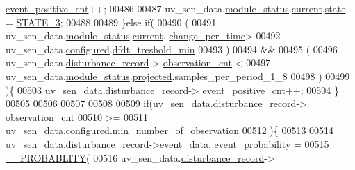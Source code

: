 \begin{DoxyCode}
      \hyperlink{a00028_a7397b9d76d4b57500f27bb23d258a18a}{event\_positive\_cnt}++;
00486 
00487                uv\_sen\_data.\hyperlink{a00035_a5a53c391562b059eb744ac679f3765ca}{module\_status}.\hyperlink{a00017_ab8af48cdbba92b3ae39c4470e53af944}{current}.\hyperlink{a00017_a6b8d8e916bc56265a3fd279bd26b6d1b}{state} = 
      \hyperlink{a00021_ad87f1bc8466a25d9f7da68717d324a22}{STATE\_3};
00488 
00489              \}\textcolor{keywordflow}{else} \textcolor{keywordflow}{if}(
00490                      (
00491                      uv\_sen\_data.\hyperlink{a00035_a5a53c391562b059eb744ac679f3765ca}{module\_status}.\hyperlink{a00017_ab8af48cdbba92b3ae39c4470e53af944}{current}.
      \hyperlink{a00017_ad5c4f9a39d2a36632a53205ae8eb5a5d}{change\_per\_time}>
00492                      uv\_sen\_data.\hyperlink{a00035_a94b2d1f6ea4ab334c74d24984dd27843}{configured}.\hyperlink{a00021_a6f5257920e763b7f5f440bc0515cd963}{dfdt\_treshold\_min}
00493                      )
00494                      &&
00495                      (
00496                      uv\_sen\_data.\hyperlink{a00035_ac9b38e2c1d3f1013a88d33506c754152}{disturbance\_record}->
      \hyperlink{a00028_ad5b0bac02ce266b91b2b52a1c3ea1d78}{observation\_cnt} <
00497                      uv\_sen\_data.\hyperlink{a00035_a5a53c391562b059eb744ac679f3765ca}{module\_status}.\hyperlink{a00017_a6b2516d74583418cec324c50041421c9}{projected}.samples\_per\_period\_1\_8
00498                      )
00499                      )\{
00503                     uv\_sen\_data.\hyperlink{a00035_ac9b38e2c1d3f1013a88d33506c754152}{disturbance\_record}->
      \hyperlink{a00028_a7397b9d76d4b57500f27bb23d258a18a}{event\_positive\_cnt}++;
00504                    \}
00505 
00506 
00507 
00508 
00509                \textcolor{keywordflow}{if}(uv\_sen\_data.\hyperlink{a00035_ac9b38e2c1d3f1013a88d33506c754152}{disturbance\_record}->
      \hyperlink{a00028_ad5b0bac02ce266b91b2b52a1c3ea1d78}{observation\_cnt}
00510                 >=
00511                 uv\_sen\_data.\hyperlink{a00035_a94b2d1f6ea4ab334c74d24984dd27843}{configured}.\hyperlink{a00021_ae8665e8bf422c1482442d6949ba28408}{min\_number\_of\_observation}
00512                )\{
00513 
00514                     uv\_sen\_data.\hyperlink{a00035_ac9b38e2c1d3f1013a88d33506c754152}{disturbance\_record}->\hyperlink{a00028_a8c0bda69e71ef674e60da47ad0be9ab0}{event\_data}.
      event\_probability =
00515                            \hyperlink{a00021_ab2185512402ea26115af112ce48175b2}{\_\_PROBABLITY}(
00516                            uv\_sen\_data.\hyperlink{a00035_ac9b38e2c1d3f1013a88d33506c754152}{disturbance\_record}->

\end{DoxyCode}
